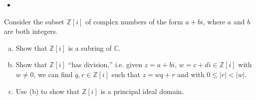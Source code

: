 \documentclass{article}
\newcounter{Problem}
\newenvironment{Problem}{\begin{Exercise}[name={Problem},
                                          counter={Problem}]}
                        {\end{Exercise}}
\begin{document}
\begin{Answer}
\begin{enumerate}[(a)]
{\begin{itemize}
{          Suppose for some $n > 0$ that $b_k = 0$ for
          $0 \leq k < n-1$. Then
          \begin{align*}
            0 = (ab)_{n + r_0}
             &= \sum_{k=0}^{n + r_0} a_k b_{n + r_0 - k} \\
             &= a_0 b_{n + r_0}
              + a_1 b_{n + r_0 - 1}
              + \cdots
              + a_{r_0} b_n
              + a_{r_0 + 1} b_{n - 1}
              + \cdots
              + a_{n + r_0} b_0 \\
             &= \sum_{k=0}^{r_0 - 1} a_k b_{r_0 - 1 - k}
              + a_{r_0} b_n
              + \sum_{k=1}^{n} a_{r_0 + k} b_{n - k} \\
             &= 0 + a_{r_0} b_n + 0
          \end{align*}
          so that $b_n = 0$.

          Therefore $a b = 0$ implies $a = 0$ or $b = 0$, so $A[[x]]$
          is an integral domain.
        }
        \item{

        }
      \end{itemize}
    }
  \end{enumerate}
\end{Answer}

\pagebreak

\begin{Problem}
  Consider the subset $\mathbb{Z}[i]$ of complex numbers of the form
  $a + bi$, where $a$ and $b$ are both integers.
  \begin{enumerate}[(a)]
    \item{
      Show that $\mathbb{Z}[i]$ is a subring of $\mathbb{C}$.
    }
    \item{
      Show that $\mathbb{Z}[i]$ ``has division,'' i.e. given
      $z = a + bi$, $w = c + di \in \mathbb{Z}[i]$ with $w \neq 0$, we
      can find $q, r \in \mathbb{Z}[i]$ such that $z = wq + r$ and
      with $0 \leq |r| < |w|$.
    }
    \item{
      Use (b) to show that $\mathbb{Z}[i]$ is a principal ideal domain.
    }
  \end{enumerate}
\end{Problem}
\end{document}
